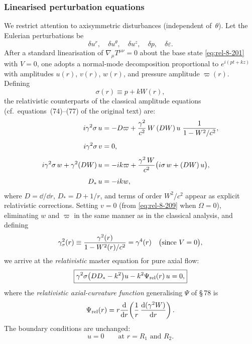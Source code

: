 \subsubsection{Linearised perturbation equations}
\label{sec:rel-8-79b-i}

We restrict attention to axisymmetric disturbances (independent
of~$\theta$).  Let the Eulerian perturbations be
\[
  \delta u^{r},\quad \delta u^{\theta},\quad
  \delta u^{z},\quad \delta p,\quad \delta\varepsilon.
\]
After a standard linearisation of
$\nabla_{\mu}T^{\mu\nu}=0$ about the base state
\eqref{eq:rel-8-201} with $V=0$, one adopts a normal-mode
decomposition proportional to $e^{i(pt+kz)}$ with amplitudes
$u(r)$, $v(r)$, $w(r)$, and pressure amplitude
$\varpi(r)$.  Defining
\begin{equation}
\label{eq:rel-8-207}
\sigma(r) \equiv p + kW(r),
\end{equation}
the relativistic counterparts of the classical amplitude equations
(cf.\ equations~(74)--(77) of the original text) are:
\begin{align}
\label{eq:rel-8-208}
i\gamma^{2}\sigma\,u &= -D\varpi
  + \frac{\gamma^{2}}{c^{2}}\,W\,(DW)\,u\;\frac{1}{1-W^{2}/c^{2}},
\\[4pt]
\label{eq:rel-8-209}
i\gamma^{2}\sigma\,v &= 0,
\\[4pt]
\label{eq:rel-8-210}
i\gamma^{2}\sigma\,w + \gamma^{2}(DW)\,u &= -ik\varpi
  + \frac{\gamma^{2}\,W}{c^{2}}\bigl(i\sigma\,w + (DW)\,u\bigr),
\\[4pt]
\label{eq:rel-8-211}
D_{*}\,u &= -ikw,
\end{align}
where $D=\dd/\dd r$, $D_{*}=D+1/r$, and terms of order $W^{2}/c^{2}$
appear as explicit relativistic corrections.  Setting $v=0$ (from
\eqref{eq:rel-8-209} when $\Omega=0$), eliminating $w$ and $\varpi$
in the same manner as in the classical analysis, and defining
\begin{equation}
\label{eq:rel-8-212}
\gamma_{\sigma}^{2}(r) \equiv
  \frac{\gamma^{2}(r)}{1-W^{2}(r)/c^{2}} = \gamma^{4}(r)
  \quad\bigl(\text{since }V=0\bigr),
\end{equation}
we arrive at the \emph{relativistic} master equation for pure axial
flow:
\begin{equation}
\label{eq:rel-8-213}
\boxed{
\gamma^{2}\sigma\bigl(DD_{*}-k^{2}\bigr)u
  - k^{2}\Psi_{\mathrm{rel}}(r)\,u = 0,
}
\end{equation}
where the \emph{relativistic axial-curvature function} generalising
$\Psi$ of \S\,78 is
\begin{equation}
\label{eq:rel-8-214}
\Psi_{\mathrm{rel}}(r)
  = r\frac{\mathrm{d}}{\mathrm{d} r}\!\left(\frac{1}{r}\,
      \frac{\mathrm{d}(\gamma^{2}W)}{\mathrm{d} r}\right).
\end{equation}
The boundary conditions are unchanged:
\begin{equation}
\label{eq:rel-8-215}
u = 0 \qquad \text{at } r = R_{1} \text{ and } R_{2}.
\end{equation}

